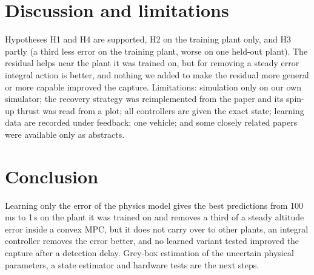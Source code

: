 \documentclass[journal]{IEEEtran}
\begin{document}
\section{Discussion and limitations}
Hypotheses H1 and H4 are supported, H2 on the training plant only, and H3 partly (a third less error on the training plant, worse on one held-out plant). The residual helps near the plant it was trained on, but for removing a steady error integral action is better, and nothing we added to make the residual more general or more capable improved the capture. Limitations: simulation only on our own simulator; the recovery strategy was reimplemented from the paper and its spin-up thrust was read from a plot; all controllers are given the exact state; learning data are recorded under feedback; one vehicle; and some closely related papers were available only as abstracts.

\section{Conclusion}
Learning only the error of the physics model gives the best predictions from 100\,ms to 1\,s on the plant it was trained on and removes a third of a steady altitude error inside a convex MPC, but it does not carry over to other plants, an integral controller removes the error better, and no learned variant tested improved the capture after a detection delay. Grey-box estimation of the uncertain physical parameters, a state estimator and hardware tests are the next steps.



\end{document}
